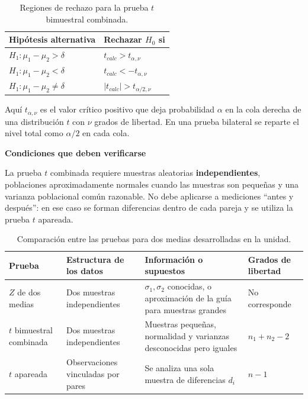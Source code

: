 \documentclass[11pt,a4paper]{article}
\newcommand{\Hcero}{H_0}
\newcommand{\Huno}{H_1}
\newenvironment{advertencia}[1][Atención]{%
  \par\medskip\noindent\begingroup\setlength{\fboxsep}{7pt}%
  \begin{lrbox}{\studybox}\begin{minipage}{\dimexpr\linewidth-2\fboxsep\relax}
  \color{naranja}\textbf{#1}\par\smallskip\color{black}}{%
  \par\end{minipage}\end{lrbox}\colorbox{naranjaclaro}{\usebox{\studybox}}\endgroup\par\medskip}
\begin{document}
\begin{table}[H]
\centering
\caption{Regiones de rechazo para la prueba $t$ bimuestral combinada.}
\small
\begin{tabularx}{.92\textwidth}{YY}
\toprule
{}
\textbf{Hipótesis alternativa} & \textbf{Rechazar $\Hcero$ si}\\
\midrule
$\Huno:\mu_1-\mu_2>\delta$ & $t_{calc}>t_{\alpha,\nu}$\\
$\Huno:\mu_1-\mu_2<\delta$ & $t_{calc}<-t_{\alpha,\nu}$\\
$\Huno:\mu_1-\mu_2\ne\delta$ & $|t_{calc}|>t_{\alpha/2,\nu}$\\
\bottomrule
\end{tabularx}
\end{table}

Aquí $t_{\alpha,\nu}$ es el valor crítico positivo que deja probabilidad $\alpha$ en la cola derecha de una distribución $t$ con $\nu$ grados de libertad. En una prueba bilateral se reparte el nivel total como $\alpha/2$ en cada cola.

\begin{advertencia}[Condiciones que deben verificarse]
La prueba $t$ combinada requiere muestras aleatorias \textbf{independientes}, poblaciones aproximadamente normales cuando las muestras son pequeñas y una varianza poblacional común razonable. No debe aplicarse a mediciones ``antes y después'': en ese caso se forman diferencias dentro de cada pareja y se utiliza la prueba $t$ apareada.
\end{advertencia}

\begin{table}[H]
\centering
\caption{Comparación entre las pruebas para dos medias desarrolladas en la unidad.}
\small
\begin{tabularx}{\textwidth}{L{2.7cm}YYL{2.7cm}}
\toprule
{}
\textbf{Prueba} & \textbf{Estructura de los datos} & \textbf{Información o supuestos} & \textbf{Grados de libertad}\\
\midrule
$Z$ de dos medias & Dos muestras independientes & $\sigma_1,\sigma_2$ conocidas, o aproximación de la guía para muestras grandes & No corresponde\\
$t$ bimuestral combinada & Dos muestras independientes & Muestras pequeñas, normalidad y varianzas desconocidas pero iguales & $n_1+n_2-2$\\
$t$ apareada & Observaciones vinculadas por pares & Se analiza una sola muestra de diferencias $d_i$ & $n-1$\\
\bottomrule
\end{tabularx}
\end{table}
\end{document}
